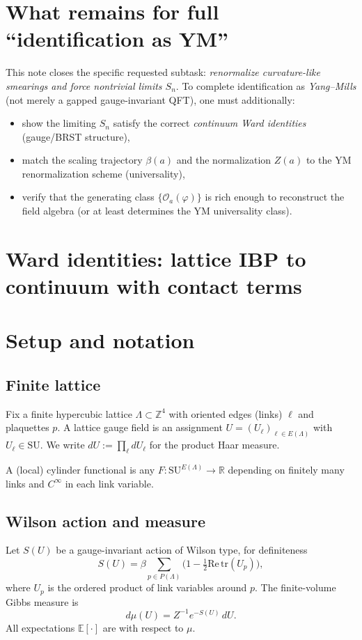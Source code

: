 \documentclass[11pt]{article}
\theoremstyle{definition}
\newcommand{\E}{\mathbb{E}}
\newcommand{\SU}{\mathrm{SU}}
\newcommand{\tr}{\mathrm{tr}}
\newcommand{\1}{\mathbf{1}}
\begin{document}
\section{What remains for full ``identification as YM''}
This note closes the specific requested subtask: \emph{renormalize curvature-like smearings and force nontrivial limits $S_n$}.
To complete identification as \emph{Yang--Mills} (not merely a gapped gauge-invariant QFT), one must additionally:
\begin{itemize}
\item show the limiting $S_n$ satisfy the correct \emph{continuum Ward identities} (gauge/BRST structure),
\item match the scaling trajectory $\beta(a)$ and the normalization $Z(a)$ to the YM renormalization scheme (universality),
\item verify that the generating class $\{\mathcal O_a(\varphi)\}$ is rich enough to reconstruct the field algebra (or at least determines the YM universality class).
\end{itemize}

\section{Ward identities: lattice IBP to continuum with contact terms}\label{sec:ward}
\section{Setup and notation}

\subsection{Finite lattice}
Fix a finite hypercubic lattice $\Lambda\subset \mathbb{Z}^4$ with oriented edges (links) $\ell$ and plaquettes $p$.
A lattice gauge field is an assignment $U=(U_{\ell})_{\ell\in E(\Lambda)}$ with $U_{\ell}\in \SU$.
We write $dU:=\prod_{\ell} dU_{\ell}$ for the product Haar measure.

A (local) cylinder functional is any $F: \SU^{E(\Lambda)}\to\mathbb{R}$ depending on finitely many links and $C^\infty$ in each link variable.

\subsection{Wilson action and measure}
Let $S(U)$ be a gauge-invariant action of Wilson type, for definiteness
\begin{equation}
  S(U)=\beta \sum_{p\in P(\Lambda)} \bigl(1-\tfrac12\mathrm{Re}\,\tr(U_p)\bigr),
\end{equation}
where $U_p$ is the ordered product of link variables around $p$.
The finite-volume Gibbs measure is
\begin{equation}
  d\mu(U)=Z^{-1} e^{-S(U)}\,dU.
\end{equation}
All expectations $\E[\cdot]$ are with respect to $\mu$.
\end{document}
